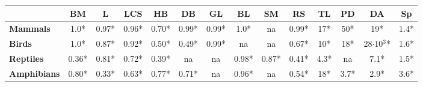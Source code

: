 \begin{table}[h!]
\begin{center}
\begin{tabular}{|l|c|c|c|c|c|c|c|c|c|c|c|c|c|}
\multicolumn{1}{|c|}{}                                & \textbf{BM}    & \textbf{L}   & \textbf{LCS}   & \textbf{HB}   & \textbf{DB}   & \textbf{GL}   & \textbf{BL}   & \textbf{SM}   & \textbf{RS}   & \textbf{TL}           & \textbf{PD}           & \textbf{DA}                & \textbf{Sp}          \\ \hline
\textbf{Mammals}                                      & 1.0*           & 0.97*        & 0.96*          & 0.70*         & 0.99*         & 0.99*         & 1.0*          & na            & 0.99*         & 17*                   & 50*                   & 19*                        & 1.4*                 \\ \hline
\textbf{Birds}                                        & 1.0*           & 0.87*        & 0.92*          & 0.50*         & 0.49*         & 0.99*         & na            & na            & 0.67*         & 10*                   & 18*                   & 28$\cdot$10$^3$*           & 1.6*                 \\ \hline
\textbf{Reptiles}                                     & 0.36*          & 0.81*        & 0.72*          & 0.39*         & na            & na            & 0.98*         & 0.87*         & 0.41*         & 4.3*                  & na                    & 7.1*                       & 1.5*                 \\ \hline
\textbf{Amphibians}                                   & 0.80*          & 0.33*        & 0.63*          & 0.77*         & 0.71*         & na            & 0.96*         & na            & 0.54*         & 18*                   & 3.7*                  & 2.9*                       & 3.6*                 \\ \hline
\end{tabular}
\end{center}
\end{table}


\pagebreak

